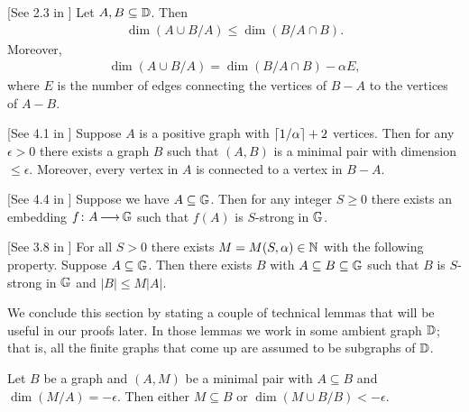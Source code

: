 \begin{Lemma} \label{diamond} [See 2.3 in \cite{laskowski}]
  Let $A, B \subseteq \mathbb D$.
  Then
  \begin{align*}
    \dim(A \cup B / A) \leq \dim(B / A \cap B).
  \end{align*}
  Moreover, 
  \begin{align*}
    \dim(A \cup B / A) = \dim(B / A \cap B) - \alpha E,
  \end{align*}
  where $E$ is the number of edges connecting the vertices of $B - A$ to the vertices of $A - B$.
\end{Lemma}

\begin{Lemma} \label{las_min} [See 4.1 in \cite{laskowski}]
  Suppose $A$ is a positive graph with $\left \lceil 1/\alpha \right \rceil + 2$ vertices.
  Then for any $\epsilon > 0$ there exists a graph $B$ such that $(A, B)$ is a minimal pair with dimension $\leq \epsilon$.
  Moreover, every vertex in $A$ is connected to a vertex in $B - A$.
\end{Lemma}

\begin{Lemma} \label{las_str} [See 4.4 in \cite{laskowski}]
  Suppose we have $A \subseteq \mathbb G$.
  Then for any integer $S \geq 0$ there exists an embedding $f \colon A \operatorname{\longrightarrow} \mathbb G$ such that $f(A)$ is $S$-strong in $\mathbb G$.
\end{Lemma}
    
\begin{Lemma} \label{las_closure} [See 3.8 in \cite{laskowski}]
  For all $S > 0$ there exists $M = M(S, \alpha) \in \mathbb{N}$ with the following property.
  Suppose $A \subseteq \mathbb G$.
  Then there exists $B$ with $A \subseteq B \subseteq \mathbb G$ such that $B$ is $S$-strong in $\mathbb G$ and $|B| \leq M|A|$.
\end{Lemma}

We conclude this section by stating a couple of technical lemmas that will be useful in our proofs later.
In those lemmas we work in some ambient graph $\mathbb D$; that is, all the finite graphs that come up are assumed to be subgraphs of $\mathbb D$.

\begin{Lemma} \label{minimal_over_set}
  Let $B$ be a graph and $(A, M)$ be a minimal pair with $A \subseteq B$ and $\dim(M/A) = -\epsilon$.
  Then either $M \subseteq B$ or $\dim(M \cup B/B) < -\epsilon$.
\end{Lemma}

